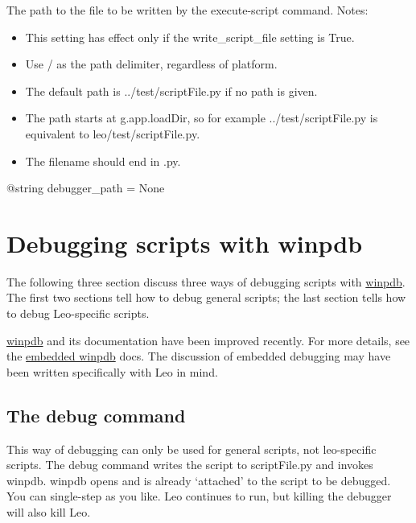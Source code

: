 \documentclass[a4paper,10pt,english]{sphinxmanual}
\begin{document}
The path to the file to be written by the execute-script command. Notes:
\begin{itemize}
\item {} 
This setting has effect only if the write\_script\_file setting is True.

\item {} 
Use / as the path delimiter, regardless of platform.

\item {} 
The default path is ../test/scriptFile.py if no path is given.

\item {} 
The path starts at g.app.loadDir, so for example ../test/scriptFile.py is equivalent to leo/test/scriptFile.py.

\item {} 
The filename should end in .py.

\end{itemize}

@string debugger\_path = None


\section{Debugging scripts with winpdb}
\label{debuggers:debugging-scripts-with-winpdb}
The following three section discuss three ways of debugging scripts with \href{http://www.digitalpeers.com/pythondebugger/}{winpdb}.
The first two sections tell how to debug general scripts;
the last section tells how to debug Leo-specific scripts.

\href{http://www.digitalpeers.com/pythondebugger/}{winpdb} and its documentation have been improved recently.
For more details, see the \href{http://www.digitalpeers.com/pythondebugger/embedded.htm}{embedded winpdb} docs.
The discussion of embedded debugging may have been written specifically with Leo in mind.


\subsection{The debug command}
\label{debuggers:the-debug-command}
This way of debugging can only be used for general scripts, not leo-specific scripts.
The debug command writes the script to scriptFile.py and invokes winpdb.
winpdb opens and is already `attached' to the script to be debugged.
You can single-step as you like.
Leo continues to run, but killing the debugger will also kill Leo.
\end{document}
